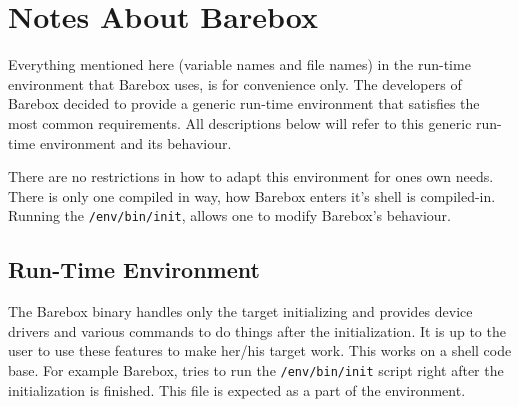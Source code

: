 %
%
%
%
%
%
%

\section{Notes About Barebox}			\label{sec:bareboxnotes}

Everything mentioned here (variable names and file names) in the run-time
environment that Barebox uses, is for convenience only. The developers of Barebox
decided to provide a generic run-time environment that satisfies the most
common requirements. All descriptions below will refer to this generic
run-time environment and its behaviour.

There are no restrictions in how to adapt this environment for ones own
needs. There is only one compiled in way, how Barebox enters it's shell is
compiled-in. Running the \texttt{/env/bin/init}, allows one to modify Barebox's
behaviour.

%
%

\subsection{Run-Time Environment}			\label{sec:bbenv}

The Barebox binary handles only the target initializing and provides device
drivers and various commands to do things after the initialization. It is up to
the user to use these features to make her/his target work. This works on a
shell code base. For example Barebox, tries to run the \texttt{/env/bin/init}
script right after the initialization is finished. This file is expected
as a part of the environment.

